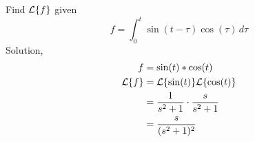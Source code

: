 \documentclass[diffeq.tex]{subfiles}
\begin{document}
    \begin{example}
        Find $\mathcal{L}\{f\}$ given
        \begin{equation}
            f = \int_{0}^{t}\sin(t-\tau)\cos(\tau)\,d\tau
        \end{equation}
        Solution,
        \begin{alignat}{1}
            f &= \sin(t) * \cos(t)\\
            \mathcal{L}\{f\} &= \mathcal{L}\{\sin(t)\}\mathcal{L}\{\cos(t)\}\\
            &= \frac{1}{s^{2} + 1}\cdot\frac{s}{s^{2} + 1}\\
            &= \frac{s}{(s^{2} + 1)^{2}}
        \end{alignat}
    \end{example}
\end{document}
